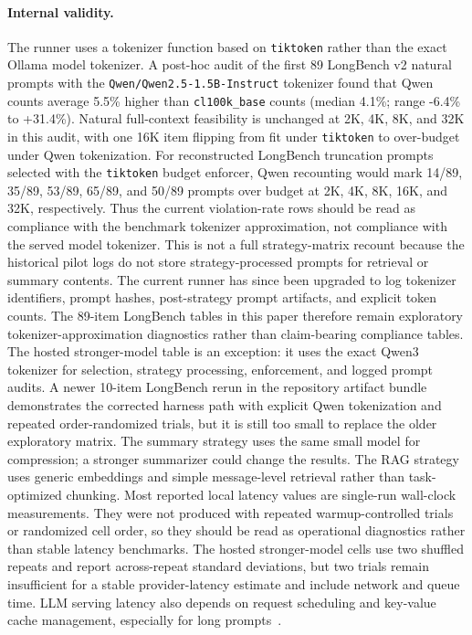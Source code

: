 \documentclass[11pt]{article}
\begin{document}
\paragraph{Internal validity.}
The runner uses a tokenizer function based on \texttt{tiktoken} rather than
the exact Ollama model tokenizer.  A post-hoc audit of the first 89 LongBench
v2 natural prompts with the \texttt{Qwen/Qwen2.5-1.5B-Instruct} tokenizer found
that Qwen counts average 5.5\% higher than \texttt{cl100k\_base} counts
(median 4.1\%; range -6.4\% to +31.4\%).  Natural full-context feasibility is
unchanged at 2K, 4K, 8K, and 32K in this audit, with one 16K item flipping from
fit under \texttt{tiktoken} to over-budget under Qwen tokenization.  For
reconstructed LongBench truncation prompts selected with the \texttt{tiktoken}
budget enforcer, Qwen recounting would mark 14/89, 35/89, 53/89, 65/89, and
50/89 prompts over budget at 2K, 4K, 8K, 16K, and 32K, respectively.  Thus the
current violation-rate rows should be read as compliance with the benchmark
tokenizer approximation, not compliance with the served model tokenizer.  This
is not a full strategy-matrix recount because the historical pilot logs do not store
strategy-processed prompts for retrieval or summary contents.  The current
runner has since been upgraded to log tokenizer identifiers, prompt hashes,
post-strategy prompt artifacts, and explicit token counts.  The 89-item
LongBench tables in this paper therefore remain exploratory
tokenizer-approximation diagnostics rather than claim-bearing compliance
tables.  The hosted stronger-model table is an exception: it uses the exact Qwen3 tokenizer for selection,
strategy processing, enforcement, and logged prompt audits.  A newer 10-item LongBench
    rerun in the repository artifact bundle demonstrates the
corrected harness path with explicit Qwen tokenization and repeated
order-randomized trials, but it is still too small to replace the older
exploratory matrix.  The
summary strategy uses the same small model for compression; a stronger
summarizer could change the results.  The RAG strategy uses generic embeddings
and simple message-level retrieval rather than task-optimized chunking.
Most reported local latency values are single-run wall-clock measurements.  They were
not produced with repeated warmup-controlled trials or randomized cell order,
so they should be read as operational diagnostics rather than stable latency
benchmarks.  The hosted stronger-model cells use two shuffled repeats and
report across-repeat standard deviations, but two trials remain insufficient
for a stable provider-latency estimate and include network and queue time.
LLM serving latency also depends on request scheduling and
key-value cache management, especially for long prompts~\citep{kwon2023pagedattention}.
\end{document}
